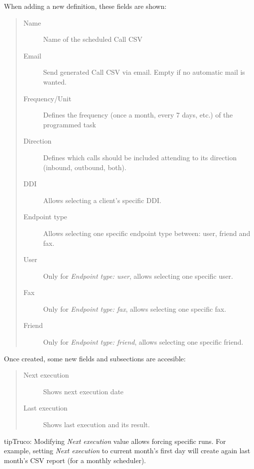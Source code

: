 \documentclass[letterpaper,10pt,spanish]{sphinxmanual}
\begin{document}
When adding a new definition, these fields are shown:
\begin{quote}
\begin{description}
\item[{Name}] \leavevmode
Name of the scheduled Call CSV

\item[{Email}] \leavevmode
Send generated Call CSV via email. Empty if no automatic mail is wanted.

\item[{Frequency/Unit}] \leavevmode
Defines the frequency (once a month, every 7 days, etc.) of the programmed task

\item[{Direction}] \leavevmode
Defines which calls should be included attending to its direction (inbound, outbound, both).

\item[{DDI}] \leavevmode
Allows selecting a client's specific DDI.

\item[{Endpoint type}] \leavevmode
Allows selecting one specific endpoint type between: user, friend and fax.

\item[{User}] \leavevmode
Only for \emph{Endpoint type: user}, allows selecting one specific user.

\item[{Fax}] \leavevmode
Only for \emph{Endpoint type: fax}, allows selecting one specific fax.

\item[{Friend}] \leavevmode
Only for \emph{Endpoint type: friend}, allows selecting one specific friend.

\end{description}
\end{quote}

Once created, some new fields and subsections are accesible:
\begin{quote}
\begin{description}
\item[{Next execution}] \leavevmode
Shows next execution date

\item[{Last execution}] \leavevmode
Shows last execution and its result.

\end{description}
\end{quote}

\begin{notice}{tip}{Truco:}
Modifying \emph{Next execution} value allows forcing specific runs. For example, setting \emph{Next execution} to
current month's first day will create again last month's CSV report (for a monthly scheduler).
\end{notice}
\end{document}
